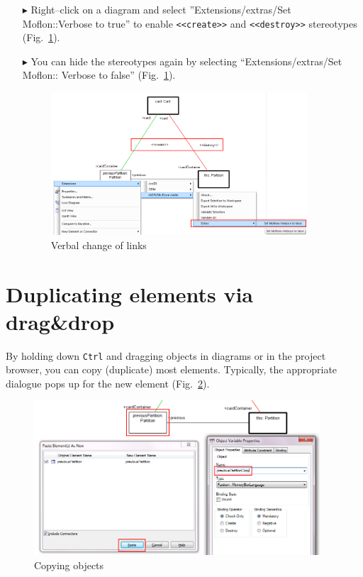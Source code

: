 \begin{enumerate}
\item[$\blacktriangleright$] 
Right–click on a diagram and select ''Extensions/extras/Set Moflon::Verbose to
true'' to enable \texttt{<<create>>} and \texttt{<<destroy>>} stereotypes (Fig.~\ref{fig_usingVerbose01}).

\item[$\blacktriangleright$] You can hide the stereotypes again by selecting
``Extensions/extras/Set Moflon:: Verbose to
false'' (Fig.~\ref{fig_usingVerbose01}).

\begin{figure}[htbp]
\begin{center}
  \includegraphics[width=0.9\textwidth]{pics/tricks/usingVerbose/usingVerbose1}
  \caption{Verbal change of links}  
  \label{fig_usingVerbose01}
\end{center}
\end{figure}
\end{enumerate}


\section{Duplicating elements via drag\&drop}
By holding down \texttt{Ctrl} and dragging objects in diagrams or in the project browser, you can copy (duplicate) most elements.
Typically, the appropriate dialogue pops up for the new element (Fig.~\ref{fig_copy01}).

\begin{figure}[htbp]
\begin{center}
  \includegraphics[width=0.95\textwidth]{pics/tricks/copy/copy1}
  \caption{Copying objects}  
  \label{fig_copy01}
\end{center}
\end{figure}


